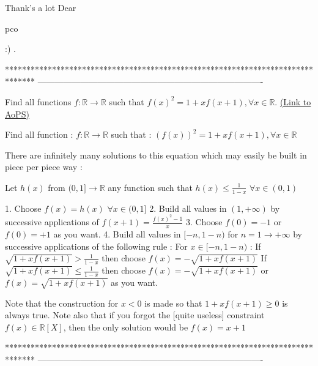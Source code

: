 \begin{solution}
	Thank's a lot Dear \begin{bolded}pco\end{bolded} :) .
\end{solution}
*******************************************************************************
-------------------------------------------------------------------------------

\begin{problem}
	Find all functions $f:\mathbb{R}\rightarrow\mathbb{R}$ such that $f(x)^2=1+xf(x+1) ,\forall{x\in{\mathbb{R}}}$.
	\flushright \href{https://artofproblemsolving.com/community/c6h472850}{(Link to AoPS)}
\end{problem}



\begin{solution}
	\begin{tcolorbox}Find all function : $f:\mathbb{R}\rightarrow\mathbb{R}$ such that : $(f(x))^2=1+xf(x+1) ,\forall{x\in{\mathbb{R}}}$\end{tcolorbox}
There are infinitely many solutions to this equation which may easily be built in piece per piece way :

Let $h(x)$ from $(0,1]\to\mathbb R$ any function such that $h(x)\le \frac 1{1-x}$ $\forall x\in(0,1)$

1. Choose $f(x)=h(x)$ $\forall x\in (0,1]$
2. Build all values in $(1,+\infty)$ by successive applications of $f(x+1)=\frac{f(x)^2-1}x$
3. Choose $f(0)=-1$ or $f(0)=+1$ as you want.
4. Build all values in $[-n,1-n)$ for $n=1\to+\infty$ by successive applications of the following rule :
For $x\in[-n,1-n)$ : 
If $\sqrt{1+xf(x+1)}>\frac 1{1-x}$ then choose $f(x)=-\sqrt{1+xf(x+1)}$
If $\sqrt{1+xf(x+1)}\le\frac 1{1-x}$ then choose $f(x)=-\sqrt{1+xf(x+1)}$ or $f(x)=\sqrt{1+xf(x+1)}$ as you want.

Note that the construction for $x<0$ is made so that $1+xf(x+1)\ge 0$ is always true.
Note also that if you forgot the [quite useless] constraint $f(x)\in\mathbb R[X]$, then the only solution would be $f(x)=x+1$
\end{solution}
*******************************************************************************
-------------------------------------------------------------------------------

